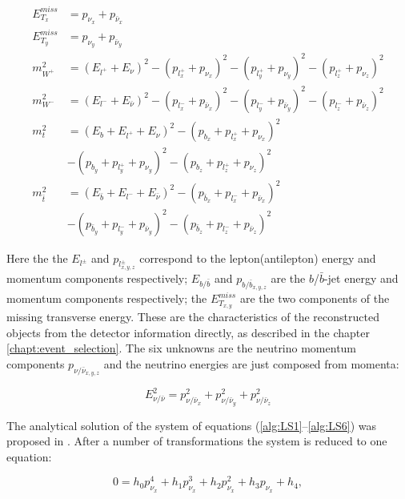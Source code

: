 \begin{align}\label{alg:LS1}
 E^{miss}_{T_{x}} & =  p_{\nu_{x}} + p_{\bar{\nu}_{x}} \\
 E^{miss}_{T_{y}} & =  p_{\nu_{y}} + p_{\bar{\nu}_{y}} \\
 m^{2}_{W^{+}} & = (E_{l^{+}} + E_{\nu})^{2} - (p_{l^{+}_{x}} + p_{\nu_{x}})^{2} - (p_{l^{+}_{y}} + p_{\nu_{y}})^{2} - (p_{l^{+}_{z}} + p_{\nu_{z}})^2 \\
 m^{2}_{W^{-}} & = (E_{l^{-}} + E_{\bar{\nu}})^{2} - (p_{l^{-}_{x}} + p_{\bar{\nu}_{x}})^{2} - (p_{l^{-}_{y}} + p_{\bar{\nu}_{y}})^{2} - (p_{l^{-}_{z}} + p_{\bar{\nu}_{z}})^2 \\
 m_{t}^{2} & = (E_{b} + E_{l^{+}} + E_{\nu})^{2} - (p_{b_{x}} + p_{l^{+}_{x}} + p_{\nu_{x}})^2 \nonumber \\
           & - (p_{b_{y}} + p_{l^{+}_{y}} + p_{\nu_{y}})^2 - (p_{b_{z}} + p_{l^{+}_{z}} + p_{\nu_{z}})^2 \\
 m_{\bar{t}}^{2} & = (E_{\bar{b}} + E_{l^{-}} + E_{\bar{\nu}})^{2} - (p_{\bar{b}_{x}} + p_{l^{-}_{x}} + p_{\bar{\nu}_{x}})^2 \nonumber \\
                 & - (p_{\bar{b}_{y}} + p_{l^{-}_{y}} + p_{\bar{\nu}_{y}})^2 - (p_{\bar{b}_{z}} + p_{l^{-}_{z}} + p_{\bar{\nu}_{z}})^2\label{alg:LS6} 
\end{align}

Here the the $E_{l^{\pm}}$ and $p_{l^{\pm}_{x,y,z}}$ correspond to the lepton(antilepton) energy and momentum components respectively; 
$E_{b/\bar{b}}$ and $p_{b/\bar{b}_{x,y,z}}$ are the $b$/$\bar{b}$-jet energy and momentum components respectively; the $E^{miss}_{T_{x,y}}$ are
the two components of the missing transverse energy.
These are the characteristics of the reconstructed objects from the detector information directly, as described in the chapter \ref{chapt:event_selection}.
The six unknowns are the neutrino momentum components $p_{\nu/\bar{\nu}_{x,y,z}}$ and the neutrino energies are just composed from momenta:

\begin{equation}
 E_{\nu/\bar{\nu}}^{2} = p_{\nu/\bar{\nu}_{x}}^{2} + p_{\nu/\bar{\nu}_{y}}^{2} + p_{\nu/\bar{\nu}_{z}}^{2}
\end{equation}

The analytical solution of the system of equations (\ref{alg:LS1}--\ref{alg:LS6}) was proposed in \cite{LSpaper}. After a number of transformations
the system is reduced to one equation:

\begin{equation}\label{eq:eqLSf}
 0 = h_{0} p_{\nu_{x}}^{4} + h_{1} p_{\nu_{x}}^{3} + h_{2} p_{\nu_{x}}^{2} + h_{3} p_{\nu_{x}} + h_{4},
\end{equation}

